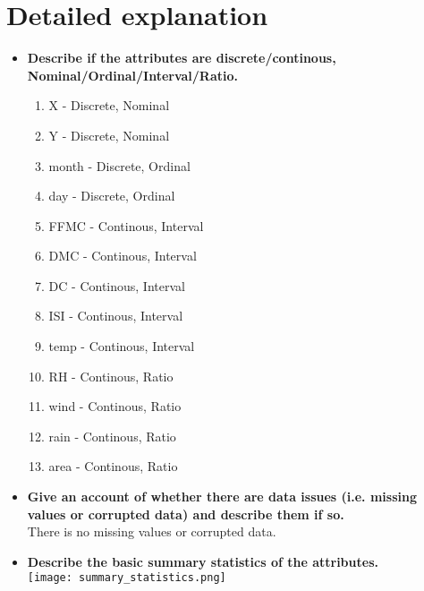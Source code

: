 \section*{Detailed explanation}

\begin{itemize}
\item \textbf{Describe if the attributes are discrete/continous, Nominal/Ordinal/Interval/Ratio.}
	\begin{enumerate}
	\item X - Discrete, Nominal
	\item Y - Discrete, Nominal
	\item month - Discrete, Ordinal
	\item day - Discrete, Ordinal
	\item FFMC - Continous, Interval
	\item DMC - Continous, Interval
	\item DC - Continous, Interval
	\item ISI - Continous, Interval
	\item temp - Continous, Interval
	\item RH - Continous, Ratio
	\item wind - Continous, Ratio
	\item rain - Continous, Ratio
	\item area - Continous, Ratio
	\end{enumerate}
\item \textbf{Give an account of whether there are data issues (i.e. missing values or corrupted data) and describe them if so.}\\
There is no missing values or corrupted data.
\item \textbf{Describe the basic summary statistics of the attributes.}\\
\texttt{[image: summary\_statistics.png]}
\end{itemize}